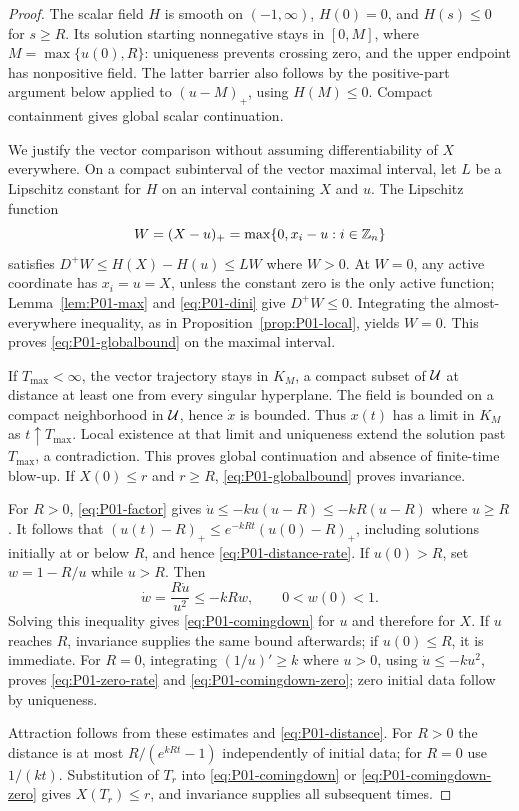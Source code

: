 \begin{proof}
The scalar field $H$ is smooth on $(-1,\infty)$, $H(0)=0$, and
$H(s)\le0$ for $s\ge R$. Its solution starting nonnegative stays in
$[0,M]$, where $M=\max\{u(0),R\}$: uniqueness prevents crossing zero,
and the upper endpoint has nonpositive field. The latter barrier also
follows by the positive-part argument below applied to $(u-M)_+$,
using $H(M)\le0$. Compact containment gives global scalar continuation.

We justify the vector comparison without assuming differentiability of
$X$ everywhere. On a compact subinterval of the vector maximal interval,
let $L$ be a Lipschitz constant for $H$ on an interval containing $X$
and $u$. The Lipschitz function
\[
 W=(X-u)_+=\max\{0,x_i-u:i\in\mathbb{Z}_n\}
\]
satisfies $D^+W\le H(X)-H(u)\le LW$ where $W>0$.
At $W=0$, any active coordinate has $x_i=u=X$, unless the constant
zero is the only active function; Lemma~\ref{lem:P01-max} and
\eqref{eq:P01-dini} give $D^+W\le0$. Integrating the almost-everywhere
inequality, as in Proposition~\ref{prop:P01-local}, yields $W=0$.
This proves \eqref{eq:P01-globalbound} on the maximal interval.

If $T_{\max}<\infty$, the vector trajectory stays in $K_M$, a compact
subset of $\mathcal{U}$ at distance at least one from every singular
hyperplane. The field is bounded on a compact neighborhood in $\mathcal{U}$,
hence $\dot x$ is bounded. Thus $x(t)$ has a limit in $K_M$ as
$t\uparrow T_{\max}$. Local existence at that limit and uniqueness
extend the solution past $T_{\max}$, a contradiction. This proves
global continuation and absence of finite-time blow-up. If
$X(0)\le r$ and $r\ge R$, \eqref{eq:P01-globalbound} proves invariance.

For $R>0$, \eqref{eq:P01-factor} gives
$\dot u\le-ku(u-R)\le-kR(u-R)$ where $u\ge R$. It follows that
$(u(t)-R)_+\le e^{-kRt}(u(0)-R)_+$, including solutions initially at
or below $R$, and hence \eqref{eq:P01-distance-rate}. If $u(0)>R$,
set $w=1-R/u$ while $u>R$. Then
\[
 \dot w=\frac{R\dot u}{u^2}\le-kR w,\qquad 0<w(0)<1.
\]
Solving this inequality gives \eqref{eq:P01-comingdown} for $u$ and
therefore for $X$. If $u$ reaches $R$, invariance supplies the same
bound afterwards; if $u(0)\le R$, it is immediate.
For $R=0$, integrating $(1/u)'\ge k$ where $u>0$, using
$\dot u\le-ku^2$, proves \eqref{eq:P01-zero-rate} and
\eqref{eq:P01-comingdown-zero}; zero initial data follow by uniqueness.

Attraction follows from these estimates and \eqref{eq:P01-distance}.
For $R>0$ the distance is at most $R/(e^{kRt}-1)$ independently of
initial data; for $R=0$ use $1/(kt)$. Substitution of $T_r$ into
\eqref{eq:P01-comingdown} or \eqref{eq:P01-comingdown-zero} gives
$X(T_r)\le r$, and invariance supplies all subsequent times.
\end{proof}

